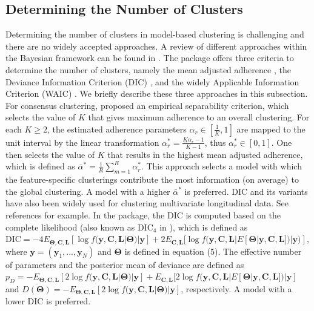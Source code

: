 \subsection{Determining the Number of Clusters}
Determining the number of clusters in model-based clustering is challenging and there are no widely accepted approaches. A review of different approaches within the Bayesian framework can be found in \citet{Celeux2006, Nasserinejad2017,Merkle2019}. The  package offers three criteria to determine the number of clusters, namely the mean adjusted adherence \citep{Lock2013}, the Deviance Information Criterion (DIC) \citep{Spiegelhalter2002, Celeux2006}, and the widely Applicable Information Criterion (WAIC) \citep{Watanabe2010, Gelman2014a}. We briefly describe these three approaches in this subsection. 
For consensus clustering, \citet{Lock2013} proposed an empirical separability criterion, which selects the value of $K$ that gives maximum adherence to an overall clustering. For each $K \ge 2$, the estimated adherence parameters $\alpha_r \in [\frac{1}{K},1]$ are mapped to the unit interval by the linear transformation  $\alpha^{*}_r = \frac{K\alpha_r - 1}{K-1}$, thus $\alpha^{*}_r \in [0,1]$. One then selects the value of $K$ that results in the highest mean adjusted adherence, which is defined as $ \bar{\alpha}^{*} = \frac{1}{R}\sum_{m=1}^R \alpha^{*}_r$.  This approach selects a model with which the feature-specific clusterings contribute the most information (on average) to the global clustering. A model with a higher $\bar{\alpha}^{*}$ is preferred.
DIC and its variants have also been widely used for clustering multivariate longitudinal data. See references \citep{Lu2019, Neelon2011, Leiby2009,Elliott2005,Fruehwirth-Schnatter2010} for example. In the  package, the DIC is computed based on the complete likelihood (also known as $\text{DIC}_4$ in \citet{Celeux2006}), which is defined as
$ \text{DIC} = -4E_{\boldsymbol{\Theta},\boldsymbol{C},\boldsymbol{L}} [\log f(\boldsymbol{y},\boldsymbol{C},\boldsymbol{L}|\boldsymbol{\Theta})|\boldsymbol{y}]+ 2E_{\boldsymbol{C},\boldsymbol{L}}[\log f(\boldsymbol{y},\boldsymbol{C},\boldsymbol{L}|E[\boldsymbol{\Theta}|\boldsymbol{y},\boldsymbol{C},\boldsymbol{L}])|\boldsymbol{y})]$, where $\boldsymbol{y} = (\boldsymbol{y}_1, ..., \boldsymbol{y}_N)$ and $\boldsymbol{\Theta}$ is defined in equation (5). The effective number of parameters and the posterior mean of deviance are defined as $p_D = - E_{\boldsymbol{\Theta},\boldsymbol{C},\boldsymbol{L}}[2\log f(\boldsymbol{y},\boldsymbol{C},\boldsymbol{L}|\boldsymbol{\Theta})|\boldsymbol{y}] +  E_{\boldsymbol{C},\boldsymbol{L}}[2\log f(\boldsymbol{y},\boldsymbol{C},\boldsymbol{L}|E[\boldsymbol{\Theta}|\boldsymbol{y},\boldsymbol{C},\boldsymbol{L}])|\boldsymbol{y}]$ and $\overline{D(\boldsymbol{\Theta})} = -E_{\boldsymbol{\Theta},\boldsymbol{C},\boldsymbol{L}}[2\log f(\boldsymbol{y},\boldsymbol{C},\boldsymbol{L}|\boldsymbol{\Theta})|\boldsymbol{y}]$, respectively. A model with a lower DIC is preferred. 
